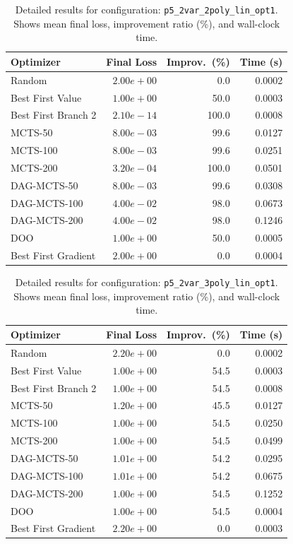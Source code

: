 \begin{table}[H]
\centering
\caption{Detailed results for configuration: \texttt{p5\_2var\_2poly\_lin\_opt1}. Shows mean final loss, improvement ratio (\%), and wall-clock time.}
\label{tab:abssum-detail-28}
\begin{tabular}{lrrr}
\toprule
Optimizer & Final Loss & Improv.~(\%) & Time (s) \\
\midrule
Random & $2.00e+00$ & 0.0 & 0.0002 \\
\hline
Best First Value & $1.00e+00$ & 50.0 & 0.0003 \\
\hline
Best First Branch 2 & \textbf{$2.10e-14$} & 100.0 & 0.0008 \\
\hline
MCTS-50 & $8.00e-03$ & 99.6 & 0.0127 \\
\hline
MCTS-100 & $8.00e-03$ & 99.6 & 0.0251 \\
\hline
MCTS-200 & $3.20e-04$ & 100.0 & 0.0501 \\
\hline
DAG-MCTS-50 & $8.00e-03$ & 99.6 & 0.0308 \\
\hline
DAG-MCTS-100 & $4.00e-02$ & 98.0 & 0.0673 \\
\hline
DAG-MCTS-200 & $4.00e-02$ & 98.0 & 0.1246 \\
\hline
DOO & $1.00e+00$ & 50.0 & 0.0005 \\
\hline
Best First Gradient & $2.00e+00$ & 0.0 & 0.0004 \\
\bottomrule
\end{tabular}
\end{table}

\begin{table}[H]
\centering
\caption{Detailed results for configuration: \texttt{p5\_2var\_3poly\_lin\_opt1}. Shows mean final loss, improvement ratio (\%), and wall-clock time.}
\label{tab:abssum-detail-29}
\begin{tabular}{lrrr}
\toprule
Optimizer & Final Loss & Improv.~(\%) & Time (s) \\
\midrule
Random & $2.20e+00$ & 0.0 & 0.0002 \\
\hline
Best First Value & $1.00e+00$ & 54.5 & 0.0003 \\
\hline
Best First Branch 2 & \textbf{$1.00e+00$} & 54.5 & 0.0008 \\
\hline
MCTS-50 & $1.20e+00$ & 45.5 & 0.0127 \\
\hline
MCTS-100 & $1.00e+00$ & 54.5 & 0.0250 \\
\hline
MCTS-200 & $1.00e+00$ & 54.5 & 0.0499 \\
\hline
DAG-MCTS-50 & $1.01e+00$ & 54.2 & 0.0295 \\
\hline
DAG-MCTS-100 & $1.01e+00$ & 54.2 & 0.0675 \\
\hline
DAG-MCTS-200 & $1.00e+00$ & 54.5 & 0.1252 \\
\hline
DOO & $1.00e+00$ & 54.5 & 0.0004 \\
\hline
Best First Gradient & $2.20e+00$ & 0.0 & 0.0003 \\
\bottomrule
\end{tabular}
\end{table}

